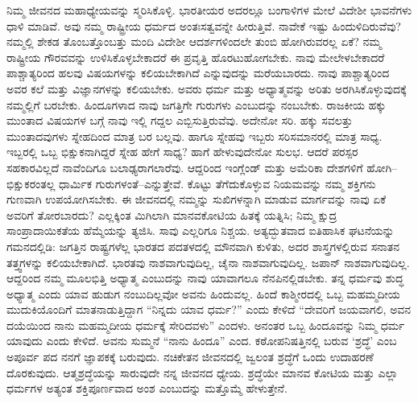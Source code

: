 ನಿಮ್ಮ ಜೀವನದ ಮಹಾಧ್ಯೇಯವನ್ನು ಸ್ಮರಿಸಿಕೊಳ್ಳಿ. ಭಾರತೀಯರ ಅದರಲ್ಲೂ ಬಂಗಾಳಿಗಳ ಮೇಲೆ ವಿದೇಶೀ ಭಾವನೆಗಳು ಧಾಳಿ ಮಾಡಿವೆ. ಅವು ನಮ್ಮ ರಾಷ್ಟ್ರೀಯ ಧರ್ಮದ ಅಂತಃಸತ್ವವನ್ನೇ ಹೀರುತ್ತಿವೆ. ನಾವೇಕೆ ಇಷ್ಟು ಹಿಂದುಳಿದಿರುವೆವು? ನಮ್ಮಲ್ಲಿ ಶೇಕಡ ತೊಂಬತ್ತೊಂಬತ್ತು ಮಂದಿ ವಿದೇಶೀ ಆದರ್ಶಗಳಿಂದಲೇ ತುಂಬಿ ಹೋಗಿರುವರಲ್ಲ ಏಕೆ? ನಮ್ಮ ರಾಷ್ಟ್ರೀಯ ಗೌರವವನ್ನು ಉಳಿಸಿಕೊಳ್ಳಬೇಕಾದರೆ ಈ ಪ್ರವೃತ್ತಿ ಹೊರಟುಹೋಗಬೇಕು. ನಾವು ಮೇಲೇಳಬೇಕಾದರೆ ಪಾಶ್ಚಾತ್ಯರಿಂದ ಹಲವು ವಿಷಯಗಳನ್ನು ಕಲಿಯಬೇಕಾಗಿದೆ ಎನ್ನುವುದನ್ನು ಮರೆಯಬಾರದು. ನಾವು ಪಾಶ್ಚಾತ್ಯರಿಂದ ಅವರ ಕಲೆ ಮತ್ತು ವಿಜ್ಞಾನಗಳನ್ನು ಕಲಿಯಬೇಕು. ಅವರು ಧರ್ಮ ಮತ್ತು ಅಧ್ಯಾತ್ಮವನ್ನು ಅರಿತು ಅರಗಿಸಿಕೊಳ್ಳುವುದಕ್ಕೆ ನಮ್ಮಲ್ಲಿಗೆ ಬರಬೇಕು. ಹಿಂದೂಗಳಾದ ನಾವು ಜಗತ್ತಿಗೇ ಗುರುಗಳು ಎಂಬುದನ್ನು ನಂಬಬೇಕು. ರಾಜಕೀಯ ಹಕ್ಕು ಮುಂತಾದ ವಿಷಯಗಳ ಬಗ್ಗೆ ನಾವು ಇಲ್ಲಿ ಗದ್ದಲ ಎಬ್ಬಿಸುತ್ತಿರುವೆವು. ಅದೇನೋ ಸರಿ. ಹಕ್ಕು ಸವಲತ್ತು ಮುಂತಾದವುಗಳು ಸ್ನೇಹದಿಂದ ಮಾತ್ರ ಬರ ಬಲ್ಲವು. ಹಾಗೂ ಸ್ನೇಹವು ಇಬ್ಬರು ಸರಿಸಮಾನರಲ್ಲಿ ಮಾತ್ರ ಸಾಧ್ಯ. ಇಬ್ಬರಲ್ಲಿ ಒಬ್ಬ ಭಿಕ್ಷುಕನಾಗಿದ್ದರೆ ಸ್ನೇಹ ಹೇಗೆ ಸಾಧ್ಯ? ಹಾಗೆ ಹೇಳುವುದೇನೋ ಸುಲಭ. ಆದರೆ ಪರಸ್ಪರ ಸಹಕಾರವಿಲ್ಲದೆ ನಾವೆಂದಿಗೂ ಬಲಾಢ್ಯರಾಗಲಾರೆವು. ಆದ್ದರಿಂದ ಇಂಗ್ಲೆಂಡ್​ ಮತ್ತು ಅಮೆರಿಕಾ ದೇಶಗಳಿಗೆ ಹೋಗಿ–ಭಿಕ್ಷುಕರಂತಲ್ಲ ಧಾರ್ಮಿಕ ಗುರುಗಳಂತೆ–ಎನ್ನುತ್ತೇವೆ. ಕೊಟ್ಟು ತೆಗೆದುಕೊಳ್ಳುವ ನಿಯಮವನ್ನು ನಮ್ಮ ಶಕ್ತಿಗನು ಗುಣವಾಗಿ ಉಪಯೋಗಿಸಬೇಕು. ಈ ಜೀವನದಲ್ಲಿ ನಮ್ಮನ್ನು ಸುಖಿಗಳನ್ನಾಗಿ ಮಾಡುವ ಮಾರ್ಗವನ್ನು ನಾವು ಏಕೆ ಅವರಿಗೆ ತೋರಬಾರದು? ಎಲ್ಲಕ್ಕಿಂತ ಮಿಗಿಲಾಗಿ ಮಾನವಕೋಟಿಯ ಹಿತಕ್ಕೆ ಯತ್ನಿಸಿ; ನಿಮ್ಮ ಕ್ಷುದ್ರ ಸಾಂಪ್ರಾದಾಯಿಕತೆಯ ಹೆಮ್ಮೆಯನ್ನು ತ್ಯಜಿಸಿ. ಸಾವು ಎಲ್ಲರಿಗೂ ನಿಶ್ಚಯ. ಅತ್ಯದ್ಭುತವಾದ ಐತಿಹಾಸಿಕ ಘಟನೆಯನ್ನು ಗಮನದಲ್ಲಿಡಿ: ಜಗತ್ತಿನ ರಾಷ್ಟ್ರಗಳೆಲ್ಲ ಭಾರತದ ಪದತಳದಲ್ಲಿ ಮೌನವಾಗಿ ಕುಳಿತು, ಅದರ ಶಾಸ್ತ್ರಗಳಲ್ಲಿರುವ ಸನಾತನ ತತ್ತ್ವಗಳನ್ನು ಕಲಿಯಬೇಕಾಗಿದೆ. ಭಾರತವು ನಾಶವಾಗುವುದಿಲ್ಲ, ಚೈನಾ ನಾಶವಾಗುವುದಿಲ್ಲ. ಜಪಾನ್​ ನಾಶವಾಗುವುದಿಲ್ಲ. ಆದ್ದರಿಂದ ನಮ್ಮ ಮೂಲಭಿತ್ತಿ ಅಧ್ಯಾತ್ಮ ಎಂಬುದನ್ನು ನಾವು ಯಾವಾಗಲೂ ನೆನಪಿನಲ್ಲಿಡಬೇಕು. ತನ್ನ ಧರ್ಮವು ಶುದ್ಧ ಅಧ್ಯಾತ್ಮ ಎಂದು ಯಾವ ಹುಡುಗ ನಂಬುದಿಲ್ಲವೋ ಅವನು ಹಿಂದುವಲ್ಲ. ಹಿಂದೆ ಕಾಶ್ಮೀರದಲ್ಲಿ ಒಬ್ಬ ಮಹಮ್ಮದೀಯ ಮುದುಕಿಯೊಂದಿಗೆ ಮಾತನಾಡುತ್ತಿದ್ದಾಗ “ನಿನ್ನದು ಯಾವ ಧರ್ಮ?” ಎಂದು ಕೇಳಿದೆ “ದೇವರಿಗೆ ಜಯವಾಗಲಿ, ಅವನ ದಯೆಯಿಂದ ನಾನು ಮಹಮ್ಮದೀಯ ಧರ್ಮಕ್ಕೆ ಸೇರಿದವಳು” ಎಂದಳು. ಅನಂತರ ಒಬ್ಬ ಹಿಂದೂವನ್ನು ನಿಮ್ಮ ಧರ್ಮ ಯಾವುದು ಎಂದು ಕೇಳಿದೆ. ಅವನು ಸುಮ್ಮನೆ “ನಾನು ಹಿಂದೂ” ಎಂದ. ಕಠೋಪನಿಷತ್ತಿನಲ್ಲಿ ಬರುವ ‘ಶ್ರದ್ಧೆ’ ಎಂಬ ಅಪೂರ್ವ ಪದ ನನಗೆ ಜ್ಞಾಪಕಕ್ಕೆ ಬರುವುದು. ನಚಿಕೇತನ ಜೀವನದಲ್ಲಿ ಜ್ವಲಂತ ಶ್ರದ್ಧೆಗೆ ಒಂದು ಉದಾಹರಣೆ ದೊರಕುವುದು. ಆತ್ಮಶ್ರದ್ಧೆಯನ್ನು ಸಾರುವುದೇ ನನ್ನ ಜೀವನದ ಧ್ಯೇಯ. ಶ್ರದ್ಧೆಯೇ ಮಾನವ ಕೋಟಿಯ ಮತ್ತು ಎಲ್ಲಾ ಧರ್ಮಗಳ ಅತ್ಯಂತ ಶಕ್ತಿಪೂರ್ಣವಾದ ಅಂಶ ಎಂಬುದನ್ನು ಮತ್ತೊಮ್ಮೆ ಹೇಳುತ್ತೇನೆ. 

